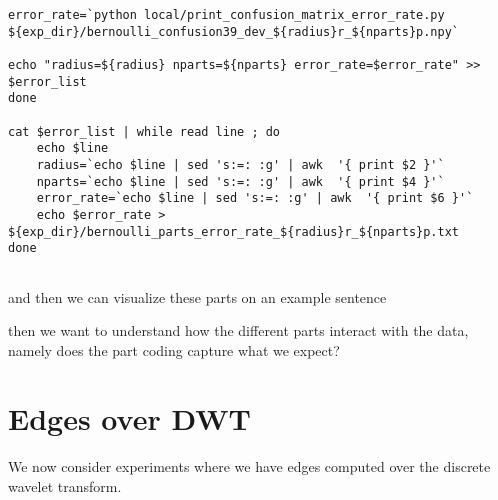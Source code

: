 \documentclass{article}
\begin{document}
\begin{verbatim}
error_rate=`python local/print_confusion_matrix_error_rate.py ${exp_dir}/bernoulli_confusion39_dev_${radius}r_${nparts}p.npy`

echo "radius=${radius} nparts=${nparts} error_rate=$error_rate" >> $error_list
done

cat $error_list | while read line ; do 
    echo $line
    radius=`echo $line | sed 's:=: :g' | awk  '{ print $2 }'`
    nparts=`echo $line | sed 's:=: :g' | awk  '{ print $4 }'`
    error_rate=`echo $line | sed 's:=: :g' | awk  '{ print $6 }'`
    echo $error_rate > ${exp_dir}/bernoulli_parts_error_rate_${radius}r_${nparts}p.txt
done


\end{verbatim}

and then we can visualize these parts on an example sentence




then we want to understand how the different parts interact with
the data, namely does the part coding capture what we expect?

\section{Edges over DWT}

We now consider experiments where we have edges computed over
the discrete wavelet transform. 
\end{document}
